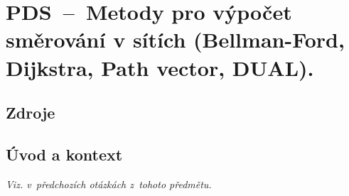 

\graphicspath{{pds/teorie_smerovani/figures}}


\chapter{PDS~--~Metody pro výpočet směrování v sítích (Bellman-Ford, Dijkstra, Path vector, DUAL).}



\section{Zdroje}

\begin{compactitem}
    \item {}
    \item {}
\end{compactitem}


\section{Úvod a kontext}

\textit{Viz.  v~předchozích otázkách z~tohoto předmětu.}

